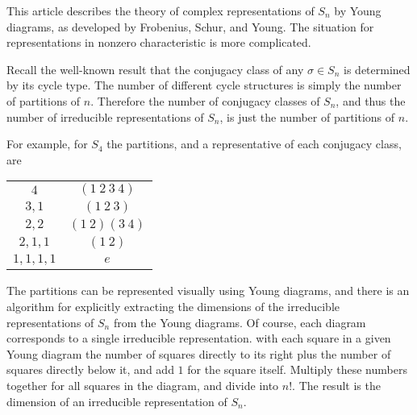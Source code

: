 \documentclass[12pt]{article}
\begin{document}
This article describes the theory of complex representations of $S_n$ by Young diagrams, as developed by Frobenius, Schur, and Young. The situation for representations in nonzero characteristic is more complicated.

Recall the well-known result that the conjugacy class of any $\sigma\in S_n$ is determined by its cycle type. The number of different cycle structures is simply the number of partitions of $n$. Therefore the number of conjugacy classes of $S_n$, and thus the number of irreducible representations of $S_n$, is just the number of partitions of $n$.

For example, for $S_4$ the partitions, and a representative of each conjugacy class, are
\begin{center}
\begin{tabular}{c c}
$4$ & $(1~2~3~4)$\\
$3,1$ & $(1~2~3)$\\
$2,2$ & $(1~2)(3~4)$\\
$2,1,1$ & $(1~2)$\\
$1,1,1,1$ & $e$
\end{tabular}
\end{center}

The partitions can be represented visually using Young diagrams, and there is an algorithm for explicitly extracting the dimensions of the irreducible representations of $S_n$ from the Young diagrams. Of course, each diagram corresponds to a single irreducible representation.  with each square in a given Young diagram the number of squares directly to its right plus the number of squares directly below it, and add $1$ for the square itself. Multiply these numbers together for all squares in the diagram, and divide into $n!$. The result is the dimension of an irreducible representation of $S_n$.
\end{document}
